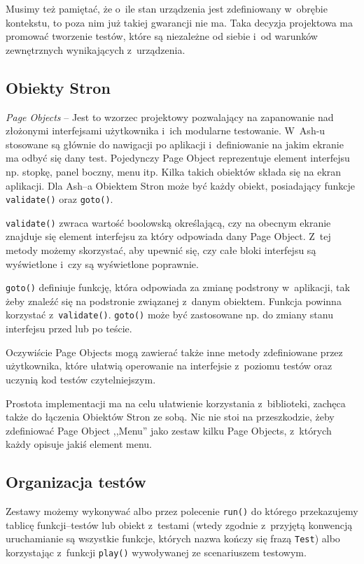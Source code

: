 \documentclass{xmgr}
\begin{document}
Musimy też pamiętać, że o~ile stan urządzenia jest zdefiniowany w~obrębie kontekstu, to poza nim już takiej gwarancji nie ma. Taka decyzja projektowa ma promować tworzenie testów, które są  niezależne od siebie i~od warunków zewnętrznych wynikających z~urządzenia.

\subsection{Obiekty Stron} 

\textit{Page Objects} -- Jest to wzorzec projektowy pozwalający na zapanowanie nad złożonymi interfejsami użytkownika i~ich modularne testowanie. W~Ash-u stosowane są głównie do nawigacji po aplikacji i~definiowanie na jakim ekranie ma odbyć się dany test. Pojedynczy Page Object reprezentuje element interfejsu np. stopkę, panel boczny, menu itp. Kilka takich obiektów składa się na ekran aplikacji. Dla Ash--a Obiektem Stron może być każdy obiekt, posiadający funkcje \texttt{validate()} oraz \texttt{goto()}.

\texttt{validate()} zwraca wartość boolowską określającą, czy na obecnym ekranie znajduje się element interfejsu za który odpowiada dany Page Object. Z~tej metody możemy skorzystać, aby upewnić się, czy całe bloki interfejsu są wyświetlone i~czy są wyświetlone poprawnie.

\texttt{goto()} definiuje funkcję, która odpowiada za zmianę podstrony w~aplikacji, tak żeby znaleźć się na podstronie związanej z~danym obiektem. Funkcja powinna korzystać z~\texttt{validate()}. \texttt{goto()} może być zastosowane np. do zmiany stanu interfejsu przed lub po teście.

Oczywiście Page Objects mogą zawierać także inne metody zdefiniowane przez użytkownika, które ułatwią operowanie na interfejsie z~poziomu testów oraz uczynią kod testów czytelniejszym.

Prostota implementacji ma na celu ułatwienie korzystania z~biblioteki, zachęca także do łączenia Obiektów Stron ze sobą. Nic nie stoi na przeszkodzie, żeby zdefiniować Page Object ,,Menu'' jako zestaw kilku Page Objects, z~których każdy opisuje jakiś element menu. 

\subsection{Organizacja testów}

Zestawy możemy wykonywać albo przez polecenie \texttt{run()} do którego przekazujemy tablicę funkcji--testów lub obiekt z~testami (wtedy zgodnie z~przyjętą konwencją uruchamianie są wszystkie funkcje, których nazwa kończy się frazą \texttt{Test}) albo korzystając z~funkcji \texttt{play()} wywoływanej ze scenariuszem testowym.
\end{document}
